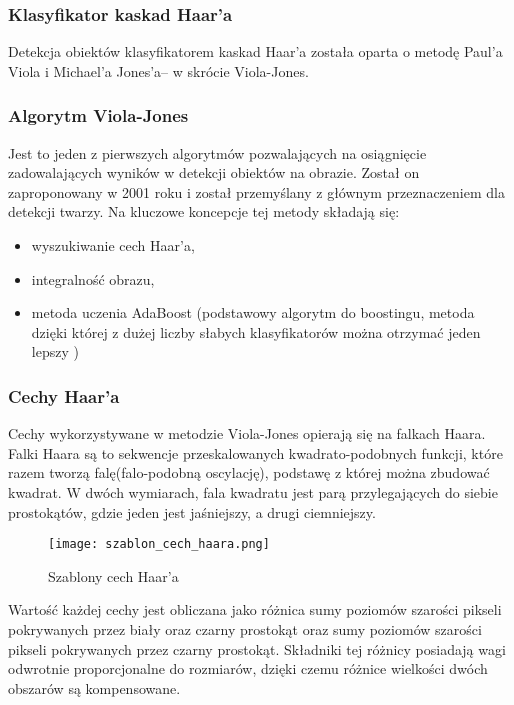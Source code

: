 \subsubsection{Klasyfikator kaskad Haar'a} \label{haar}
Detekcja obiektów klasyfikatorem kaskad Haar'a została oparta o metodę Paul'a Viola i Michael'a Jones'a– w skrócie Viola-Jones.

\subsubsection{Algorytm Viola-Jones}
Jest to jeden z pierwszych algorytmów pozwalających na osiągnięcie zadowalających wyników w detekcji obiektów na obrazie. Został on zaproponowany w 2001 roku i został przemyślany z głównym przeznaczeniem dla detekcji twarzy. Na kluczowe koncepcje tej metody składają się:
\begin{itemize}
\item wyszukiwanie cech Haar'a,
\item integralność obrazu,
\item metoda uczenia AdaBoost (podstawowy algorytm do boostingu, metoda dzięki której z dużej liczby słabych klasyfikatorów można otrzymać jeden lepszy )
\end{itemize}

\subsubsection{Cechy Haar'a}
Cechy wykorzystywane w metodzie Viola-Jones opierają się na falkach Haara. Falki Haara są to sekwencje przeskalowanych kwadrato-podobnych funkcji, które razem tworzą falę(falo-podobną oscylację), podstawę z której można zbudować kwadrat. W dwóch wymiarach, fala kwadratu jest parą przylegających do siebie prostokątów, gdzie jeden jest jaśniejszy, a drugi ciemniejszy.
\begin{figure}[H]
	\centering
	\texttt{[image: szablon\_cech\_haara.png]}
	\caption{Szablony cech Haar'a}
	\label{fig:szablon_cech_haara}
\end{figure}
Wartość każdej cechy jest obliczana jako różnica sumy poziomów szarości pikseli pokrywanych przez biały oraz czarny prostokąt oraz sumy poziomów szarości pikseli pokrywanych przez czarny prostokąt. Składniki tej różnicy posiadają wagi odwrotnie proporcjonalne do rozmiarów, dzięki czemu różnice wielkości dwóch obszarów są kompensowane.

